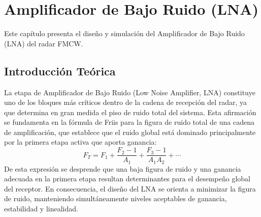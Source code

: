 \chapter{Amplificador de Bajo Ruido (LNA)}
\label{chap:lna}
Este capítulo presenta el diseño y simulación del Amplificador de Bajo Ruido (LNA) del radar FMCW.
\section{Introducción Teórica}
La etapa de Amplificador de Bajo Ruido (Low Noise Amplifier, LNA) constituye uno de los bloques más críticos dentro de la cadena de recepción del radar, ya que determina en gran medida el piso de ruido total del sistema. Esta afirmación se fundamenta en la fórmula de Friis para la figura de ruido total de una cadena de amplificación, que establece que el ruido global está dominado principalmente por la primera etapa activa que aporta ganancia:
\[
F_T = F_1 + \frac{F_2 - 1}{A_1} + \frac{F_3 - 1}{A_1 A_2} + \cdots
\]
De esta expresión se desprende que una baja figura de ruido y una ganancia adecuada en la primera etapa resultan determinantes para el desempeño global del receptor. En consecuencia, el diseño del LNA se orienta a minimizar la figura de ruido, manteniendo simultáneamente niveles aceptables de ganancia, estabilidad y linealidad.
